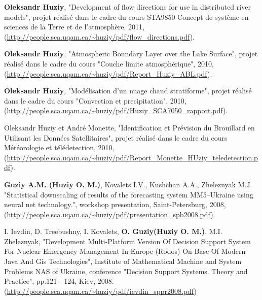 \documentclass[letterpaper]{article}
\renewenvironment{itemize}{
  \begin{list}{}{
    \setlength{\leftmargin}{0em}
  }
}{
  \end{list}
}
\begin{document}
\begin{itemize}
    \item \textbf{Oleksandr Huziy}, "Development of flow directions for use in
    distributed river models", projet réalisé dans le cadre du cours STA9850
    Concept de système en sciences de la Terre et de l'atmosphère, 2011,
    (\url{http://people.sca.uqam.ca/~huziy/pdf/flow_directions.pdf}).
   
    \item \textbf{Oleksandr Huziy}, "Atmospheric Boundary Layer over the Lake Surface",
           projet réalisé dans le cadre du cours "Couche limite atmosphérique",
           2010, (\url{http://people.sca.uqam.ca/~huziy/pdf/Report_Huziy_ABL.pdf}).
   
    \item \textbf{Oleksandr Huziy}, "Modélisation d’un nuage chaud stratiforme",
       projet réalisé dans le cadre du cours "Convection et precipitation", 2010,
       (\url{http://people.sca.uqam.ca/~huziy/pdf/Huziy_SCA7050_rapport.pdf}).

    \item Oleksandr Huziy et André Monette, "Identification et Prévision du
    Brouillard en Utilisant les Données Satellitaires", projet réalisé dans le cadre du cours Météorologie et télédetection,
       2010, (\url{http://people.sca.uqam.ca/~huziy/pdf/Report_Monette_HUziy_teledetection.pdf}).

    \item \textbf{Guziy A.M. (Huziy O. M.)}, Kovalets I.V., Kushchan A.A.,
    Zheleznyak M.J.
    "Statistical downscaling of results of the forecasting system MM5–Ukraine using neural net technology.",
    workshop presentation, Saint-Petersburg, 2008, (\url{http://people.sca.uqam.ca/~huziy/pdf/presentation_spb2008.pdf}).

    \item I. Ievdin, D. Treebushny, I. Kovalets, \textbf{O. Guziy(Huziy O. M.)}, M.I.
    Zheleznyak, "Development Multi-Platform Version Of Decision Support System For Nuclear Emergency Management In Europe (Rodos)
    On Base Of Modern Java And Gis Technologies", 
    Institute of Mathematical Machine and System Problems NAS of Ukraine, conference
    "Decision Support Systems. Theory and Practice", pp.121 - 124, Kiev, 2008.
     (\url{http://people.sca.uqam.ca/~huziy/pdf/ievdin_sppr2008.pdf})

\end{itemize}
\end{document}
